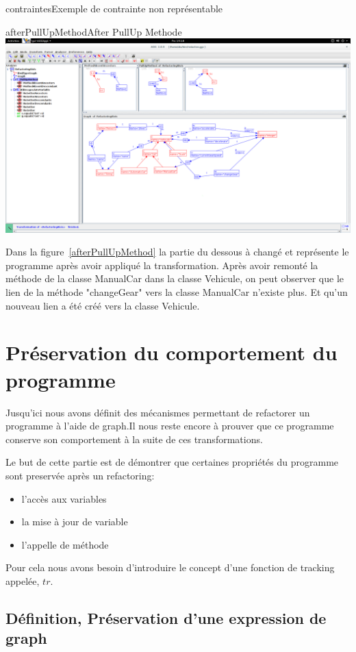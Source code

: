 \documentclass[a4paper, 12pt]{article}
\begin{document}
\begin{figu}{contraintes}{Exemple de contrainte non représentable}
  \begin{myfig}{afterPullUpMethod}{After PullUp Methode}
    \includegraphics[width=\textwidth]{afterPullUpMethod.png}
  \end{myfig}

  Dans la figure~\ref{afterPullUpMethod} la partie du dessous à changé et représente le programme après avoir appliqué la transformation.
  Après avoir remonté la méthode de la classe ManualCar dans la classe Vehicule,
  on peut observer que le lien de la méthode "changeGear" vers la classe ManualCar n'existe plus. Et qu'un nouveau lien a été créé vers la classe Vehicule.

  \section{Préservation du comportement du programme}

  Jusqu'ici nous avons définit des mécanismes permettant de refactorer un programme à l'aide de graph.Il nous reste encore à prouver que ce programme conserve son comportement à la suite de ces transformations.

  Le but de cette partie est de démontrer que certaines propriétés du programme sont preservée après un refactoring:
  \begin{itemize}[label=\textbullet]
    \item l'accès aux variables
    \item la mise à jour de variable
    \item l'appelle de méthode
  \end{itemize}

  Pour cela nous avons besoin d'introduire le concept d'une fonction de tracking appelée, \(tr\).

  \subsection{Définition, Préservation d'une expression de graph}


\end{figu}
\end{document}
